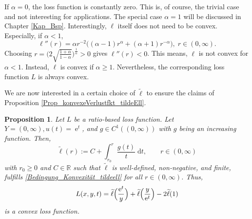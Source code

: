 \documentclass[10pt]{article}
\newcommand{\R}{\mathbb{R}}
\DeclareMathOperator{\e}{e}
\newtheorem{proposition}[theorem]{Proposition}
\begin{document}
If $\alpha = 0$, the loss function is constantly zero. 
This is, of course, the trivial case and not interesting for applications.
The special case  $\alpha = 1$ will be discussed in Chapter \ref{Kap_Bsp}.
Interestingly, $\ell$ itself does not need to be convex.
Especially, if $\alpha < 1$,
\begin{equation*}
	\ell''(r) = \alpha r^{-2}\bigl((\alpha-1)r^\alpha + (\alpha+1)r^{-\alpha}\bigr), \; r \in (0, \infty).
\end{equation*}
Choosing $r = \biggl(2\sqrt{\frac{1+\alpha}{1-\alpha}}\biggr)^{\frac{1}{\alpha}} > 0$ gives $\ell''(r) < 0$. 
This means, $\ell$ is not convex for $\alpha < 1$.
Instead, $\ell$ is convex if $\alpha \geq 1$.
Nevertheless, the corresponding loss function $L$ is always convex. \par
We are now interested in a certain choice of $\widetilde{\ell}$ to ensure the claims of Proposition \ref{Prop_konvexeVerlustfkt_tildeEll}.
\begin{proposition} \label{Prop_BspKonvexeVerlustfkt_Integral}
	Let $L$ be a ratio-based loss function. 
	Let $Y = (0, \infty), u(t) = \e^t$, and $g \in C^1((0, \infty))$ with $g$ being an increasing function.
	Then,
	\begin{equation*}
		\widetilde{\ell}(r) := C + \int_{r_0}^{r} \frac{g(t)}{t} \; \mathrm{d}t, \qquad r \in (0, \infty)
	\end{equation*}
	with $r_0 \geq 0$ and $C \in \R$ such that $\widetilde{\ell}$ is well-defined, non-negative, and finite, fulfills \eqref{Bedingung_Konvexität_tildeell} for all $r \in (0, \infty)$. 
	Thus, 
	\begin{equation*}
		L(x,y,t) = \widetilde{\ell}\Bigl(\frac{\e^t}{y}\Bigr) + \widetilde{\ell}\Bigl(\frac{y}{\e^t}\Bigr) - 2\widetilde{\ell}(1)
	\end{equation*}
	is a convex loss function.
\end{proposition}
\end{document}
